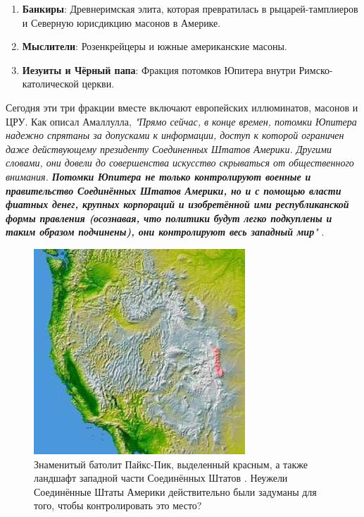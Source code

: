 \documentclass[10pt,twocolumn,letterpaper]{article}
\begin{document}
\begin{flushleft}
\begin{enumerate}
    \item \textbf{Банкиры}: Древнеримская элита, которая превратилась в рыцарей-тамплиеров и Северную юрисдикцию масонов в Америке.
    \item \textbf{Мыслители}: Розенкрейцеры и южные американские масоны.
    \item \textbf{Иезуиты и Чёрный папа}: Фракция потомков Юпитера внутри Римско-католической церкви.
\end{enumerate}
\end{flushleft}

Сегодня эти три фракции вместе включают европейских иллюминатов, масонов и ЦРУ. Как описал Амаллулла, \textit{"Прямо сейчас, в конце времен, потомки Юпитера надежно спрятаны за допусками к информации, доступ к которой ограничен даже действующему президенту Соединенных Штатов Америки. Другими словами, они довели до совершенства искусство скрываться от общественного внимания. \textbf{Потомки Юпитера не только контролируют военные и правительство Соединённых Штатов Америки, но и с помощью власти фиатных денег, крупных корпораций и изобретённой ими республиканской формы правления (осознавая, что политики будут легко подкуплены и таким образом подчинены), они контролируют весь западный мир}"} \cite{33,34}.

\begin{figure}[t]
\begin{center}
   \includegraphics[width=1\linewidth]{pike.jpg}
\end{center}
   \caption{Знаменитый батолит Пайкс-Пик, выделенный красным, а также ландшафт западной части Соединённых Штатов \cite{36}. Неужели Соединённые Штаты Америки действительно были задуманы для того, чтобы контролировать это место?}
\label{fig:11}
\label{fig:onecol}
\end{figure}
\end{document}
